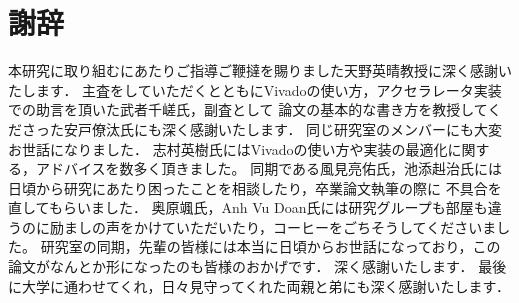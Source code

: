 \chapter{謝辞}
{
本研究に取り組むにあたりご指導ご鞭撻を賜りました天野英晴教授に深く感謝いたします．
主査をしていただくとともにVivadoの使い方，アクセラレータ実装での助言を頂いた武者千嵯氏，副査として
論文の基本的な書き方を教授してくださった安戸僚汰氏にも深く感謝いたします．
同じ研究室のメンバーにも大変お世話になりました．
志村英樹氏にはVivadoの使い方や実装の最適化に関する，アドバイスを数多く頂きました。
同期である風見亮佑氏，池添赳治氏には日頃から研究にあたり困ったことを相談したり，卒業論文執筆の際に
不具合を直してもらいました．
奥原颯氏，Anh Vu Doan氏には研究グループも部屋も違うのに励ましの声をかけていただいたり，コーヒーをごちそうしてくださいました。
研究室の同期，先輩の皆様には本当に日頃からお世話になっており，この論文がなんとか形になったのも皆様のおかげです．
深く感謝いたします．
最後に大学に通わせてくれ，日々見守ってくれた両親と弟にも深く感謝いたします．

}
